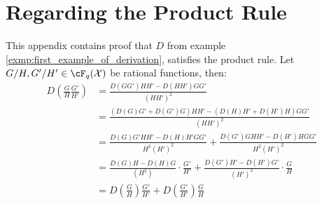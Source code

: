 \chapter{Regarding the Product Rule}\label{app:calc}
This appendix contains proof that $D$ from example \ref{exmp:first_example_of_derivation}, satisfies the product rule. Let $G / H, G' / H' \in \cF_{q}(\mathcal{X})$ be rational functions, then:
\begin{align*}
    D \left(\frac{G}{H} \frac{G'}{H'}\right) &= \frac{D(G G')H H' - D(H H') G G'}{(H H')^{2}}\\
                                             &= \frac{\left(D(G)G' + D(G')G\right)H H' - \left(D(H)H' + D(H')H\right)G G'}{(H H')^{2}}\\
                                             &= \frac{D(G)G' H H' - D(H) H' G G'}{H^{2}(H')^{2}} + \frac{D(G')G H H' - D(H')H G G'}{H^{2}(H')^{2}}\\
                                             &= \frac{D(G)H - D(H)G}{(H^{2})} \cdot \frac{G'}{H'} + \frac{D(G')H' - D(H')G'}{(H')^{2}} \cdot \frac{G}{H} \\
                                             &= D \left(\frac{G}{H}\right) \frac{G'}{H'} + D\left(\frac{G'}{H'}\right) \frac{G}{H}
\end{align*}
